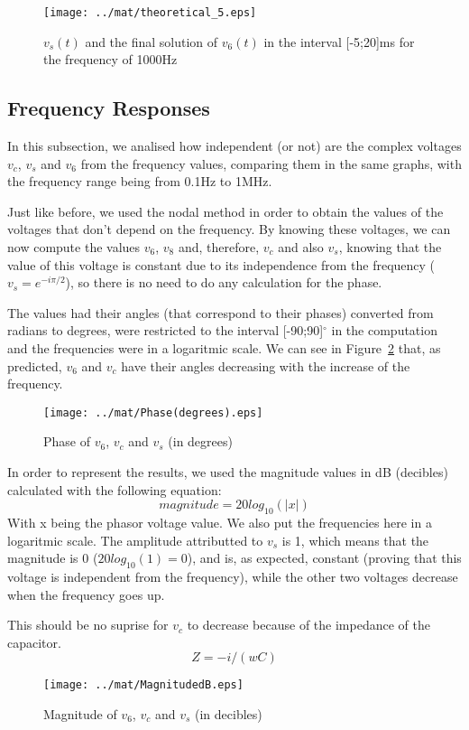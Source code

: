 \begin{figure}[H] \centering
\texttt{[image: ../mat/theoretical\_5.eps]}
\caption{$v_s(t)$ and the final solution of $v_6(t)$ in the interval [-5;20]ms for the frequency of 1000Hz}
\label{fig:mat4}
\end{figure}


\subsection{Frequency Responses}
In this subsection, we analised how independent (or not) are the complex voltages $v_c$, $v_s$ and $v_6$ from the frequency values, comparing them in the same graphs, with the frequency range being from 0.1Hz to 1MHz. 

Just like before, we used the nodal method in order to obtain the values of the voltages that don't depend on the frequency. By knowing these voltages, we can now compute the values $v_6$, $v_8$ and, therefore, $v_c$ and also $v_s$, knowing that the value of this voltage is constant due to its independence from the frequency ($v_s = e^{-i\pi/2}$), so there is no need to do any calculation for the phase.

The values had their angles (that correspond to their phases) converted from radians to degrees, were restricted to the interval [-90;90]$^{\circ}$ in the computation and the frequencies were in a logaritmic scale. We can see in Figure~\ref{fig:mat5db} that, as predicted, $v_6$ and $v_c$ have their angles decreasing with the increase of the frequency.

\begin{figure}[H] \centering
\texttt{[image: ../mat/Phase(degrees).eps]}
\caption{Phase of $v_6$, $v_c$ and $v_s$ (in degrees)}
\label{fig:mat5db}
\end{figure}

In order to represent the results, we used the magnitude values in dB (decibles) calculated with the following equation:
\begin{equation}
magnitude = 20log_{10}(|x|)
\label{eq:1.21}
\end{equation}
With x being the phasor voltage value. 
We also put the frequencies here in a logaritmic scale. The amplitude attributted to $v_s$ is 1, which means that the magnitude is 0 ($20log_{10}(1)=0$), and is, as expected, constant (proving that this voltage is independent from the frequency), while the other two voltages decrease when the frequency goes up. 

This should be no suprise for $v_c$ to decrease because of the impedance of the capacitor.
\begin{equation}
Z = -i/(wC)
\label{eq:1.22}
\end{equation}

\begin{figure}[H] \centering
\texttt{[image: ../mat/MagnitudedB.eps]}
\caption{Magnitude of $v_6$, $v_c$ and $v_s$ (in decibles)}
\label{fig:mat5ps}
\end{figure}





